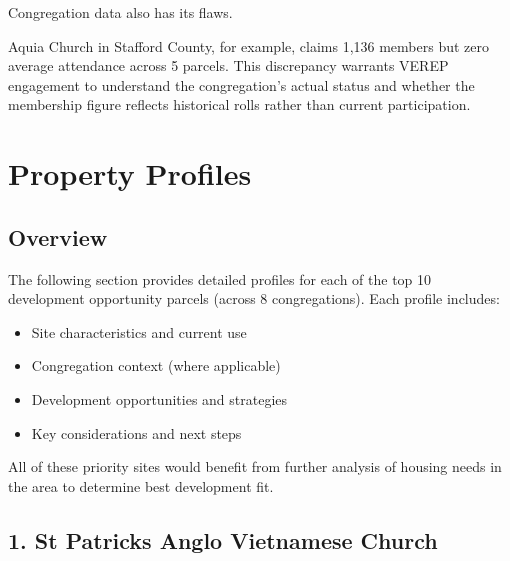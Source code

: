 \documentclass[
  letterpaper,
  DIV=11,
  numbers=noendperiod,
  oneside]{scrreprt}
\providecommand{\tightlist}{%
  \setlength{\itemsep}{0pt}\setlength{\parskip}{0pt}}
\begin{document}
\begin{tcolorbox}[enhanced jigsaw, bottomtitle=1mm, left=2mm, rightrule=.15mm, colbacktitle=quarto-callout-caution-color!10!white, arc=.35mm, title=\textcolor{quarto-callout-caution-color}{\faFire}\hspace{0.5em}{Caution}, bottomrule=.15mm, colback=white, colframe=quarto-callout-caution-color-frame, leftrule=.75mm, titlerule=0mm, opacitybacktitle=0.6, breakable, coltitle=black, toptitle=1mm, toprule=.15mm, opacityback=0]

Congregation data also has its flaws.

Aquia Church in Stafford County, for example, claims 1,136 members but
zero average attendance across 5 parcels. This discrepancy warrants
VEREP engagement to understand the congregation's actual status and
whether the membership figure reflects historical rolls rather than
current participation.

\end{tcolorbox}


\chapter{Property Profiles}\label{property-profiles}

\section{Overview}\label{overview}

The following section provides detailed profiles for each of the top 10
development opportunity parcels (across 8 congregations). Each profile
includes:

\begin{itemize}
\tightlist
\item
  Site characteristics and current use
\item
  Congregation context (where applicable)
\item
  Development opportunities and strategies
\item
  Key considerations and next steps
\end{itemize}

All of these priority sites would benefit from further analysis of
housing needs in the area to determine best development fit.

\section*{1. St Patricks Anglo Vietnamese
Church}\label{st-patricks-anglo-vietnamese-church}
\end{document}

